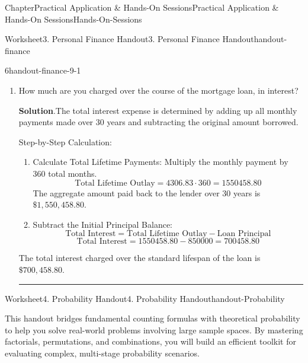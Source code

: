 \documentclass[oneside,10pt,]{book}
\newcommand{\blocktitlefont}{\relax}
\newlength{\workspacestrutwidth}
\begin{document}
\begin{chapterptx}{Chapter}{Practical Application \& Hands-On Sessions}{}{Practical Application \& Hands-On Sessions}{}{}{Hands-On-Sessions}
\begin{worksheet-section}{Worksheet}{3. Personal Finance Handout}{}{3. Personal Finance Handout}{}{}{handout-finance}
\begin{divisionexercise}{6}{}{}{handout-finance-9-1}
\begin{enumerate}[font=\bfseries,label=(\alph*),ref=\alph*]
\par\rule{\workspacestrutwidth}{1in}%
\item{}How much are you charged over the course of the mortgage loan, in interest?%
\par\smallskip%
\noindent\textbf{\blocktitlefont Solution}.\hypertarget{handout-finance-9-1-5-2}{}\quad{}The total interest expense is determined by adding up all monthly payments made over 30 years and subtracting the original amount borrowed.%
\par
Step-by-Step Calculation:%
\begin{enumerate}[label={(\alph*)}]
\item{}Calculate Total Lifetime Payments: Multiply the monthly payment by 360 total months.%
\begin{equation*}
\text{Total Lifetime Outlay} = 4306.83 \cdot 360 = 1550458.80
\end{equation*}
The aggregate amount paid back to the lender over 30 years is \(\$1,550,458.80\).%
\item{}Subtract the Initial Principal Balance:%
\begin{equation*}
\text{Total Interest} = \text{Total Lifetime Outlay} - \text{Loan Principal}
\end{equation*}
%
\begin{equation*}
\text{Total Interest} = 1550458.80 - 850000 = 700458.80
\end{equation*}
%
\end{enumerate}
%
\par
The total interest charged over the standard lifespan of the loan is \(\$700,458.80\).%
\par\rule{\workspacestrutwidth}{1in}%
\end{enumerate}%
\end{divisionexercise}%
\end{worksheet-section}
\restoregeometry
%
%
\typeout{************************************************}
\typeout{************************************************}
%
\begin{worksheet-section}{Worksheet}{4. Probability Handout}{}{4. Probability Handout}{}{}{handout-Probability}
\begin{introduction}{}%
This handout bridges fundamental counting formulas with theoretical probability to help you solve real-world problems involving large sample spaces. By mastering factorials, permutations, and combinations, you will build an efficient toolkit for evaluating complex, multi-stage probability scenarios.%

\end{introduction}
\end{worksheet-section}
\end{chapterptx}
\end{document}
